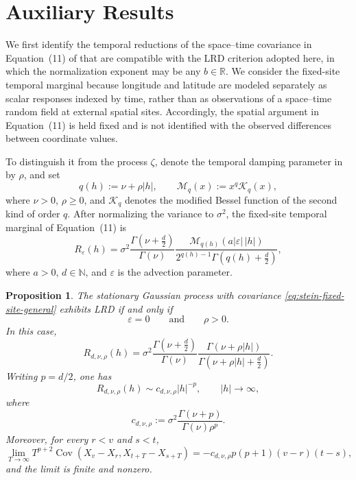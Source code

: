 \documentclass[preprint,12pt,authoryear]{elsarticle}
\newtheorem{prop}{Proposition}
\begin{document}
\section{Auxiliary Results}

We first identify the temporal reductions of the space--time covariance
in Equation~(11) of \citet{Stein2005} that are compatible with the LRD
criterion adopted here, in which the normalization exponent may be any
\(b\in\mathbb R\). We consider the fixed-site temporal marginal because
longitude and latitude are modeled separately as scalar responses indexed
by time, rather than as observations of a space--time random field at
external spatial sites. Accordingly, the spatial argument in
Equation~(11) is held fixed and is not identified with the observed
differences between coordinate values.

To distinguish it from the process \(\zeta\), denote the temporal damping parameter in \citet{Stein2005} by \(\rho\), and set
\[
q(h):=\nu+\rho|h|,
\qquad
\mathcal{M}_{q}(x):=x^{q}\mathcal{K}_{q}(x),
\]
where \(\nu>0\), \(\rho\geq0\), and \(\mathcal{K}_{q}\) denotes the modified Bessel function of the second kind of order \(q\). After normalizing the variance to \(\sigma^2\), the fixed-site temporal marginal of Equation~(11) is
\begin{equation}\label{eq:stein-fixed-site-general}
R_{\varepsilon}(h)
=
\sigma^2
\frac{\Gamma\!\left(\nu+\frac d2\right)}{\Gamma(\nu)}
\frac{
\mathcal{M}_{q(h)}
\!\left(a|\varepsilon|\,|h|\right)
}{
2^{q(h)-1}
\Gamma\!\left(q(h)+\frac d2\right)
},
\end{equation}
where \(a>0\), \(d\in\mathbb N\), and \(\varepsilon\) is the advection parameter.

\begin{prop}
\label{prop:stein-lrd-classification}
The stationary Gaussian process with covariance
\eqref{eq:stein-fixed-site-general} exhibits LRD if and only if
\[
\varepsilon=0
\qquad\text{and}\qquad
\rho>0.
\]
In this case,
\begin{equation}\label{eq:stein-gamma-ratio}
R_{d,\nu,\rho}(h)
=
\sigma^2
\frac{\Gamma\!\left(\nu+\frac d2\right)}{\Gamma(\nu)}
\frac{\Gamma(\nu+\rho|h|)}
{\Gamma\!\left(\nu+\rho|h|+\frac d2\right)}.
\end{equation}
Writing \(p=d/2\), one has
\begin{equation}\label{eq:stein-gamma-tail}
R_{d,\nu,\rho}(h)
\sim
c_{d,\nu,\rho}|h|^{-p},
\qquad
|h|\to\infty,
\end{equation}
where
\[
c_{d,\nu,\rho}
:=
\sigma^2
\frac{\Gamma(\nu+p)}
{\Gamma(\nu)\rho^p}.
\]
Moreover, for every \(r<v\) and \(s<t\),
\begin{equation}\label{eq:stein-increment-lrd}
\lim_{T\to\infty}
T^{p+2}
\operatorname{Cov}
\left(
X_v-X_r,
X_{t+T}-X_{s+T}
\right)
=
-c_{d,\nu,\rho}
p(p+1)(v-r)(t-s),
\end{equation}
and the limit is finite and nonzero.
\end{prop}
\end{document}
